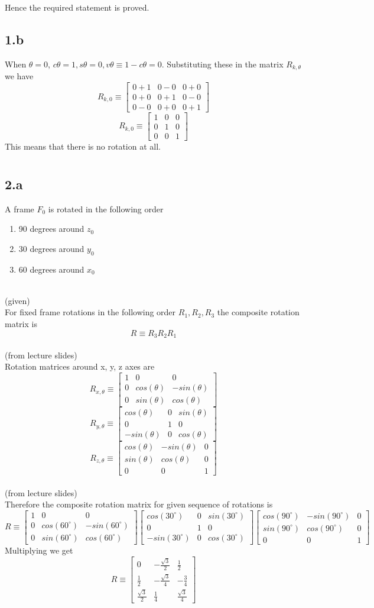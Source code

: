 \documentclass[12pt]{article}
\newcommand{\fromlectures}{{\\ \color{blue} \hspace*{\fill}(from lecture slides)} \\}
\newcommand{\given}{{\\ \color{blue} \hspace*{\fill}(given)} \\}
\newcommand{\rx}[1]{\begin{bmatrix} 1 & 0 & 0 \\ 0 & cos(#1) & -sin(#1) \\ 0 & sin(#1) & cos(#1) \end{bmatrix}}
\newcommand{\ry}[1]{\begin{bmatrix} cos(#1) & 0 & sin(#1) \\ 0 & 1 & 0 \\ -sin(#1) & 0 & cos(#1) \end{bmatrix}}
\newcommand{\rz}[1]{\begin{bmatrix} cos(#1) & -sin(#1) & 0 \\ sin(#1) & cos(#1) & 0 \\ 0 & 0 & 1 \end{bmatrix}}
\begin{document}
Hence the required statement is proved.
\pagebreak

\subsection*{1.b}
When $\theta = 0$, $c\theta = 1, s\theta = 0, v\theta \equiv 1 - c\theta = 0$.
Substituting these in the matrix $ R_{k,\theta} $ we have
\[
  R_{k,0} \equiv
  \begin{bmatrix} 0 + 1 & 0 - 0 & 0 + 0 \\ 0 + 0 & 0 + 1 & 0 - 0 \\ 0 - 0 & 0 + 0 & 0 + 1 \end{bmatrix}
\]
\[
  R_{k,0} \equiv
  \begin{bmatrix} 1 & 0 & 0 \\ 0 & 1 & 0 \\ 0 & 0 & 1 \end{bmatrix}
\]
This means that there is no rotation at all.
\pagebreak

\section{}
\subsection*{2.a}
A frame $F_0$ is rotated in the following order
\begin{enumerate}[nolistsep]
  \item 90 degrees around $z_0$
  \item 30 degrees around $y_0$
  \item 60 degrees around $x_0$
\end{enumerate}
\given

For fixed frame rotations in the following order $R_1, R_2, R_3$ the composite rotation matrix is
\[
  R \equiv R_3 R_2 R_1
\]
\fromlectures

Rotation matrices around x, y, z axes are
\[
  R_{x,\theta} \equiv \rx{\theta}
\]
\[
  R_{y,\theta} \equiv \ry{\theta}
\]
\[
  R_{z,\theta} \equiv \rz{\theta}
\]
\fromlectures
Therefore the composite rotation matrix for given sequence of rotations is
\[
  R \equiv
  \rx{60^\circ}
  \ry{30^\circ}
  \rz{90^\circ}
\]
Multiplying we get
\[
  R \equiv
  \begin{bmatrix}
    0 & -\frac{\sqrt{3}}{2} & \frac{1}{2} \\
    \frac{1}{2} & -\frac{\sqrt{3}}{4} & -\frac{3}{4} \\
    \frac{\sqrt{3}}{2} & \frac{1}{4} & \frac{\sqrt{3}}{4}
  \end{bmatrix}
\]
\pagebreak
\end{document}
